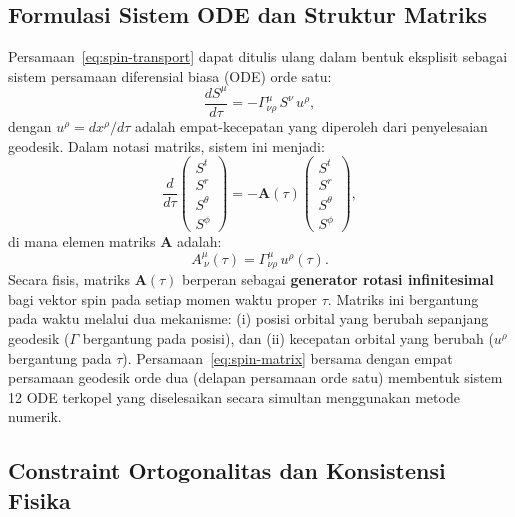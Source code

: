 \subsection{Formulasi Sistem ODE dan Struktur Matriks}
\label{subsec:spin-ode-system}

Persamaan~\eqref{eq:spin-transport} dapat ditulis ulang dalam bentuk eksplisit sebagai sistem persamaan diferensial biasa (ODE) orde satu:
\begin{equation}
    \frac{dS^\mu}{d\tau} = -\Gamma^\mu_{\nu\rho}\, S^\nu\, u^\rho,
    \label{eq:spin-ode}
\end{equation}
dengan $u^\rho = dx^\rho/d\tau$ adalah empat-kecepatan yang diperoleh dari penyelesaian geodesik. Dalam notasi matriks, sistem ini menjadi:
\begin{equation}
    \frac{d}{d\tau}
    \begin{pmatrix} S^t \\ S^r \\ S^\theta \\ S^\phi \end{pmatrix}
    = -\mathbf{A}(\tau)
    \begin{pmatrix} S^t \\ S^r \\ S^\theta \\ S^\phi \end{pmatrix},
    \label{eq:spin-matrix}
\end{equation}
di mana elemen matriks $\mathbf{A}$ adalah:
\begin{equation}
    A^\mu_{\ \nu}(\tau) = \Gamma^\mu_{\nu\rho}\, u^\rho(\tau).
    \label{eq:matrix-A}
\end{equation}
Secara fisis, matriks $\mathbf{A}(\tau)$ berperan sebagai \textbf{generator rotasi infinitesimal} bagi vektor spin pada setiap momen waktu proper $\tau$. Matriks ini bergantung pada waktu melalui dua mekanisme: (i) posisi orbital yang berubah sepanjang geodesik ($\Gamma$ bergantung pada posisi), dan (ii) kecepatan orbital yang berubah ($u^\rho$ bergantung pada $\tau$). Persamaan~\eqref{eq:spin-matrix} bersama dengan empat persamaan geodesik orde dua (delapan persamaan orde satu) membentuk sistem 12 ODE terkopel yang diselesaikan secara simultan menggunakan metode numerik.

\subsection{Constraint Ortogonalitas dan Konsistensi Fisika}
\label{subsec:constraint-ortogonalitas}

